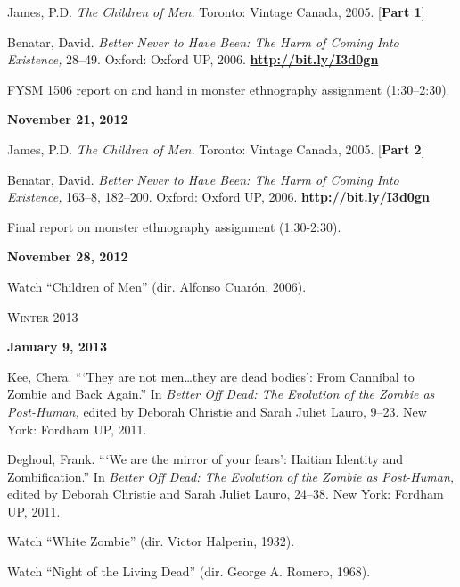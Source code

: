\documentclass[12pt]{article}
\begin{document}
\begin{hangparas}{.5in}{1}
James, P.D. \textit{The Children of Men.} Toronto: Vintage Canada, 2005. [\textbf{Part 1}]

Benatar, David. \textit{Better Never to Have Been: The Harm of Coming Into Existence,} 28--49. Oxford: Oxford UP, 2006. \href{http://bit.ly/I3d0gn}{\textbf{http://bit.ly/I3d0gn}}

FYSM 1506 report on and hand in monster ethnography assignment (1:30--2:30).
\end{hangparas}

\textbf{November 21, 2012}

\begin{hangparas}{.5in}{1}
James, P.D. \textit{The Children of Men.} Toronto: Vintage Canada, 2005. [\textbf{Part 2}]

Benatar, David. \textit{Better Never to Have Been: The Harm of Coming Into Existence,} 163--8, 182--200. Oxford: Oxford UP, 2006. \href{http://bit.ly/I3d0gn}{\textbf{http://bit.ly/I3d0gn}}
\end{hangparas}

Final report on monster ethnography assignment (1:30-2:30).

\textbf{November 28, 2012}

Watch ``Children of Men'' (dir. Alfonso Cuar\'on, 2006).

\vspace{.125in}

\begin{center}
{\Large \textsc{Winter 2013}}
\end{center}

\vspace{.125in}


\textbf{January 9, 2013}

\begin{hangparas}{.5in}{1}
Kee, Chera. ```They are not men\ldots they are dead bodies': From Cannibal to Zombie and Back Again.'' In \textit{Better Off Dead: The Evolution of the Zombie as Post-Human,} edited by Deborah Christie and Sarah Juliet Lauro, 9--23. New York: Fordham UP, 2011. 

Deghoul, Frank. ```We are the mirror of your fears': Haitian Identity and Zombification.'' In \textit{Better Off Dead: The Evolution of the Zombie as Post-Human,} edited by Deborah Christie and Sarah Juliet Lauro, 24--38. New York: Fordham UP, 2011. 

Watch ``White Zombie'' (dir. Victor Halperin, 1932).

Watch ``Night of the Living Dead'' (dir. George A. Romero, 1968).
\end{hangparas}
\end{document}
